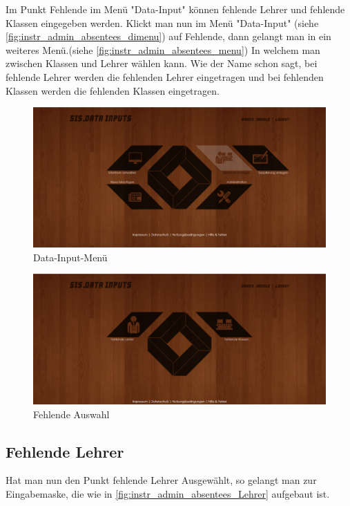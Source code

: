 Im Punkt Fehlende im Menü "Data-Input" können fehlende Lehrer und fehlende Klassen eingegeben werden. Klickt man nun im Menü "Data-Input" (siehe \autoref{fig:instr_admin_absentees_dimenu}) auf Fehlende, dann gelangt man in ein weiteres Menü.(siehe \autoref{fig:instr_admin_absentees_menu}) In welchem man zwischen Klassen und Lehrer wählen kann. Wie der Name schon sagt, bei fehlende Lehrer werden die fehlenden Lehrer eingetragen und bei fehlenden Klassen werden die fehlenden Klassen eingetragen.
\begin{figure}[H]
\centering
\includegraphics[keepaspectratio=true, width=14cm]{images/screenshots/data-inputs2.png}
\caption{Data-Input-Menü}
\label{fig:instr_admin_absentees_dimenu}
\end{figure}
\begin{figure}[H]
\centering
\includegraphics[keepaspectratio=true, width=14cm]{images/screenshots/data-inputs_absentees.png}
\caption{Fehlende Auswahl}
\label{fig:instr_admin_absentees_menu}
\end{figure}
\subsection{Fehlende Lehrer}
Hat man nun den Punkt fehlende Lehrer Ausgewählt, so gelangt man zur Eingabemaske, die wie in \autoref{fig:instr_admin_absentees_Lehrer} aufgebaut ist.
